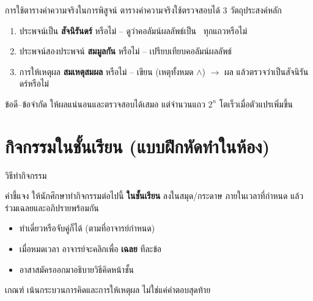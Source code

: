 \begin{frame}{การใช้ตารางค่าความจริงในการพิสูจน์}
  ตารางค่าความจริงใช้ตรวจสอบได้ 3 วัตถุประสงค์หลัก
  \begin{enumerate}
    \item ประพจน์เป็น \textbf{สัจนิรันดร์} หรือไม่ -- ดูว่าคอลัมน์ผลลัพธ์เป็น \TT\ ทุกแถวหรือไม่
    \item ประพจน์สองประพจน์ \textbf{สมมูลกัน} หรือไม่ -- เปรียบเทียบคอลัมน์ผลลัพธ์
    \item การให้เหตุผล \textbf{สมเหตุสมผล} หรือไม่ -- เขียน (เหตุทั้งหมด $\land$) $\rightarrow$ ผล
          แล้วตรวจว่าเป็นสัจนิรันดร์หรือไม่
  \end{enumerate}
  \vspace{0.6em}
  \begin{block}{ข้อดี--ข้อจำกัด}
    ให้ผลแน่นอนและตรวจสอบได้เสมอ แต่จำนวนแถว $2^n$ โตเร็วเมื่อตัวแปรเพิ่มขึ้น
  \end{block}
\end{frame}


\section{กิจกรรมในชั้นเรียน (แบบฝึกหัดทำในห้อง)}

\begin{frame}{วิธีทำกิจกรรม}
  \begin{block}{คำชี้แจง}
    ให้นักศึกษาทำกิจกรรมต่อไปนี้ \textbf{ในชั้นเรียน} ลงในสมุด/กระดาษ
    ภายในเวลาที่กำหนด แล้วร่วมเฉลยและอภิปรายพร้อมกัน
  \end{block}
  \vspace{0.5em}
  \begin{itemize}
    \item ทำเดี่ยวหรือจับคู่ก็ได้ (ตามที่อาจารย์กำหนด)
    \item เมื่อหมดเวลา อาจารย์จะคลิกเพื่อ \textbf{เฉลย} ทีละข้อ
    \item อาสาสมัครออกมาอธิบายวิธีคิดหน้าชั้น
  \end{itemize}
  \vspace{0.5em}
  \begin{exampleblock}{เกณฑ์}
    เน้นกระบวนการคิดและการให้เหตุผล ไม่ใช่แค่คำตอบสุดท้าย
  \end{exampleblock}
\end{frame}

